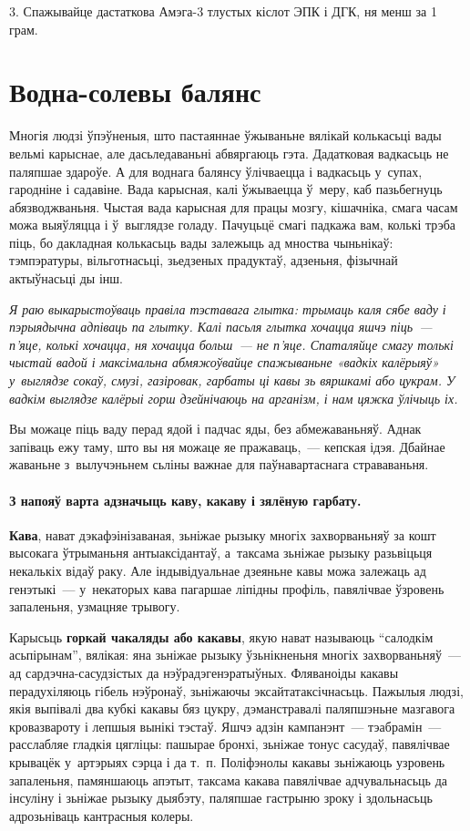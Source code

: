3. Спажывайце дастаткова Амэга-3 тлустых кіслот ЭПК і ДГК, ня менш за 1 грам.


\section{Водна-солевы балянс}

Многія людзі ўпэўненыя, што пастаяннае ўжываньне вялікай колькасьці вады вельмі карыснае, але дасьледаваньні абвяргаюць гэта. Дадатковая вадкасьць не паляпшае здароўе. А для воднага балянсу ўлічваецца і вадкасьць у~супах, гародніне і садавіне. Вада карысная, калі ўжываецца ў~меру, каб пазьбегнуць абязводжваньня. Чыстая вада карысная для працы мозгу, кішачніка, смага часам можа выяўляцца і ў~выглядзе голаду. Пачуцьцё смагі падкажа вам, колькі трэба піць, бо дакладная колькасьць вады залежыць ад мноства чыньнікаў: тэмпэратуры, вільготнасьці, зьедзеных прадуктаў, адзеньня, фізычнай актыўнасьці ды інш.

\emph{Я раю выкарыстоўваць правіла тэставага глытка: трымаць каля сябе ваду і пэрыядычна адпіваць па глытку. Калі пасьля глытка хочацца яшчэ піць~--- п'яце, колькі хочацца, ня хочацца больш~--- не п'яце. Спаталяйце смагу толькі чыстай вадой і максімальна абмяжоўвайце спажываньне «вадкіх калёрыяў» у~выглядзе сокаў, смузі, газіровак, гарбаты ці кавы зь вяршкамі або цукрам. У вадкім выглядзе калёрыі горш дзейнічаюць на арганізм, і нам цяжка ўлічыць іх.}

Вы можаце піць ваду перад ядой і падчас яды, без абмежаваньняў. Аднак запіваць ежу таму, што вы ня можаце яе пражаваць,~--- кепская ідэя. Дбайнае жаваньне з~вылучэньнем сьліны важнае для паўнавартаснага страваваньня.

\paragraph{З напояў варта адзначыць каву, какаву і зялёную гарбату.} \textbf{Кава}, нават дэкафэінізаваная, зьніжае рызыку многіх захворваньняў за кошт высокага ўтрыманьня антыаксідантаў, а~таксама зьніжае рызыку разьвіцьця некалькіх відаў раку. Але індывідуальнае дзеяньне кавы можа залежаць ад генэтыкі~--- у~некаторых кава пагаршае ліпідны профіль, павялічвае ўзровень запаленьня, узмацняе трывогу.

Карысьць \textbf{горкай чакаляды або какавы}, якую нават называюць ``салодкім асьпірынам'', вялікая: яна зьніжае рызыку ўзьнікненьня многіх захворваньняў~--- ад сардэчна-сасудзістых да нэўрадэгенэратыўных. Фляваноіды какавы перадухіляюць гібель нэўронаў, зьніжаючы эксайтатаксічнасьць. Пажылыя людзі, якія выпівалі два кубкі какавы бяз цукру, дэманстравалі паляпшэньне мазгавога кровазвароту і лепшыя вынікі тэстаў. Яшчэ адзін кампанэнт~--- тэабрамін~--- расслабляе гладкія цягліцы: пашырае бронхі, зьніжае тонус сасудаў, павялічвае крывацёк у~артэрыях сэрца і да т.~п. Поліфэнолы какавы зьніжаюць узровень запаленьня, памяншаюць апэтыт, таксама какава павялічвае адчувальнасьць да інсуліну і зьніжае рызыку дыябэту, паляпшае гастрыню зроку і здольнасьць адрозьніваць кантрасныя колеры.

